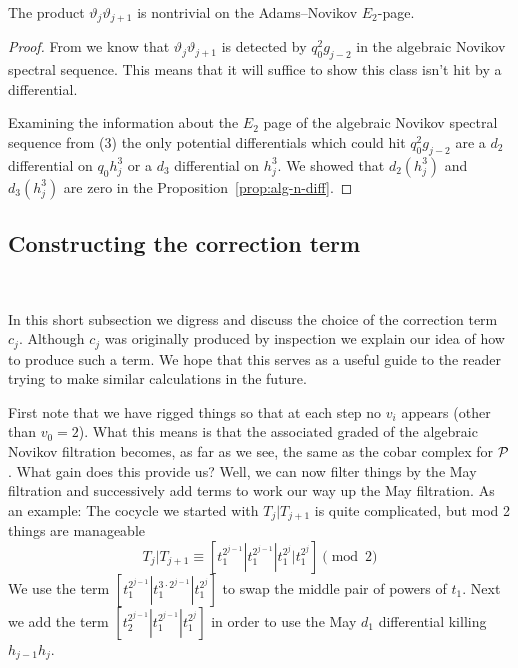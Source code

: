   


\begin{cor}
  The product $\vartheta_j\vartheta_{j+1}$ is nontrivial on the Adams--Novikov $E_2$-page.
\end{cor}

\begin{proof}
  From  we know that $\vartheta_j\vartheta_{j+1}$ is detected by $q_0^2g_{j-2}$ in the algebraic Novikov spectral sequence. This means that it will suffice to show this class isn't hit by a differential.
  
  Examining the information about the $E_2$ page of the algebraic Novikov spectral sequence from (3) the only potential differentials which could hit $q_0^2g_{j-2}$ are a $d_2$ differential on $q_0h_j^3$ or a $d_3$ differential on $h_j^3$.
  We showed that $d_2(h_j^3)$ and $d_3(h_j^3)$ are zero in the Proposition~\ref{prop:alg-n-diff}.
\end{proof}


\subsection{Constructing the correction term}\ 
\label{subsec:correction}

In this short subsection we digress and discuss the choice of the correction term $c_j$. 
Although $c_j$ was originally produced by inspection we explain our idea of how to produce such a term. We hope that this serves as a useful guide to the reader trying to make similar calculations in the future. 

First note that we have rigged things so that at each step no $v_i$ appears (other than $v_0 = 2$).
What this means is that the associated graded of the algebraic Novikov filtration becomes, as far as we see, the same as the cobar complex for $\P$. What gain does this provide us? Well, we can now filter things by the May filtration and successively add terms to work our way up the May filtration. As an example: The cocycle we started with $T_j|T_{j+1}$ is quite complicated, but mod 2 things are manageable
\[ T_j | T_{j+1} \equiv [t_1^{2^{j-1}}|t_1^{2^{j-1}}|t_1^{2^{j}}|t_1^{2^{j}}] \pmod{2} \]
We use the term $[t_1^{2^{j-1}}|t_1^{3 \cdot 2^{j-1}}|t_1^{2^{j}}]$ to swap the middle pair of powers of $t_1$.
Next we add the term $[t_2^{2^{j-1}}|t_1^{2^{j-1}}|t_1^{2^{j}}]$ in order to use the May $d_1$ differential killing $h_{j-1}h_j$.


